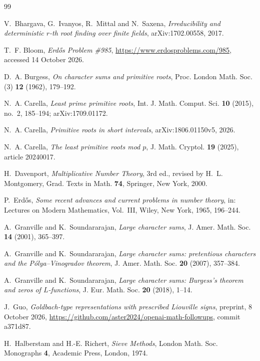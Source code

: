 \documentclass[12pt]{amsart}
\theoremstyle{remark}
\begin{document}
\begin{thebibliography}{99}

 V.~Bhargava, G.~Ivanyos, R.~Mittal and N.~Saxena, \emph{Irreducibility and
deterministic $r$-th root finding over finite fields}, arXiv:1702.00558, 2017.

 T.~F. Bloom, \emph{Erd\H{o}s Problem \#985},
\url{https://www.erdosproblems.com/985}, accessed 14 October 2026.

 D.~A. Burgess, \emph{On character sums and primitive roots}, Proc. London
Math. Soc. (3) \textbf{12} (1962), 179--192.

 N.~A. Carella, \emph{Least prime primitive roots}, Int. J. Math. Comput. Sci.
\textbf{10} (2015), no.~2, 185--194; arXiv:1709.01172.

 N.~A. Carella, \emph{Primitive roots in short intervals}, arXiv:1806.01150v5,
2026.

 N.~A. Carella, \emph{The least primitive roots mod $p$}, J. Math. Cryptol.
\textbf{19} (2025), article 20240017.

 H.~Davenport, \emph{Multiplicative Number Theory}, 3rd ed., revised by
H.~L. Montgomery, Grad. Texts in Math. \textbf{74}, Springer, New York, 2000.

 P.~Erd\H{o}s, \emph{Some recent advances and current problems in number theory},
in: Lectures on Modern Mathematics, Vol.~III, Wiley, New York, 1965, 196--244.

 A.~Granville and K.~Soundararajan, \emph{Large character sums}, J. Amer. Math.
Soc. \textbf{14} (2001), 365--397.

 A.~Granville and K.~Soundararajan, \emph{Large character sums: pretentious
characters and the P\'olya--Vinogradov theorem}, J. Amer. Math. Soc. \textbf{20} (2007), 357--384.

 A.~Granville and K.~Soundararajan, \emph{Large character sums: Burgess's
theorem and zeros of $L$-functions}, J. Eur. Math. Soc. \textbf{20} (2018), 1--14.

 J.~Guo, \emph{Goldbach-type representations with prescribed Liouville signs},
preprint, 8 October 2026, \url{https://github.com/aster2024/openai-math-followups}, commit
a371d87.

 H.~Halberstam and H.-E. Richert, \emph{Sieve Methods}, London Math. Soc.
Monographs \textbf{4}, Academic Press, London, 1974.


\end{thebibliography}
\end{document}
